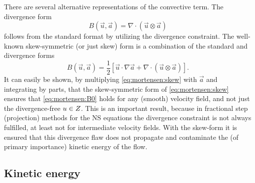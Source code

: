 There are several alternative representations of the convective
term. The divergence form
\begin{equation}
B(\vec{u},\vec{a})=\nabla \cdot (\vec{u} \otimes \vec{a})
\end{equation}
follows from the standard format by utilizing the divergence
constraint. The well-known skew-symmetric (or just skew) form is
a combination of the standard and divergence forms
\begin{equation}
 B(\vec{u},\vec{a}) = \frac{1}{2}\left[ \vec{u} \cdot \nabla \vec{a}
          + \nabla \cdot (\vec{u} \otimes \vec{a}) \right].
\label{eq:mortensen:skew}
\end{equation}
It can easily be shown, by multiplying \eqref{eq:mortensen:skew} with
$\vec{a}$ and integrating by parts, that the skew-symmetric form of
\eqref{eq:mortensen:skew} ensures that \eqref{eq:mortensen:B0} holds
for any (smooth) velocity field, and not just the divergence-free ${u} \in Z$.
This is an important result, because in fractional step (projection)
methods for the NS equations the divergence constraint is not always
fulfilled, at least not for intermediate velocity fields. With the
skew-form it is ensured that this divergence flaw does not propagate
and contaminate the (of primary importance) kinetic energy of the flow.

\subsection{Kinetic energy}
\label{sec:mortensen:kinetic}

